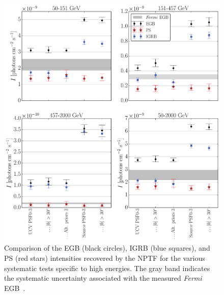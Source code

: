 \begin{figure}[phtb] %
   \centering
   \includegraphics[width=\textwidth]{ch-igrb/plots/combined_intensities_HE_v2.pdf} 
   \caption{Comparison of the EGB (black circles), IGRB (blue squares), and PS (red stars) intensities recovered by the NPTF for the various systematic tests specific to high energies.  The gray band indicates the systematic uncertainty associated with the measured \emph{Fermi} EGB~\cite{Ackermann:2014usa}.  %
   }
   \label{fig:systematics_HE}
\end{figure}


